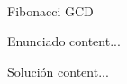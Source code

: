 \documentclass{article}
\title{                                             %
    \vspace{2in}
    \textmd{\textbf{\asignatura \\ \titulo}} \\         %
    \normalsize\vspace{0.1in}\small{\fecha}  \\         %
    \vspace{3in}
}
\author{\textbf{\autor}}                            %
\date{}                                             %
\theoremstyle{theorem-style}  %
\theoremstyle{definition}
\theoremstyle{example-style}
\begin{document}
\maketitle



\newpage
\tableofcontents
\newpage

\begin{section}{Fibonacci  GCD}

\begin{subsection}{Enunciado}
content...
\end{subsection}

\begin{subsection}{Solución}
content...
\end{subsection}


\end{section}
\end{document}
